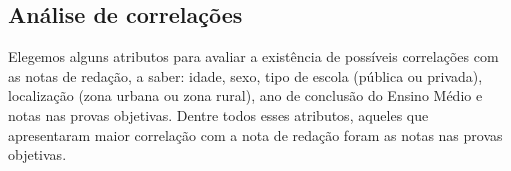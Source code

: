 \documentclass[12pt]{article}
\newcommand{\reffig}[1]{Fig.~\ref{fig:#1}}
\begin{document}

\subsection{Análise de correlações}
Elegemos alguns atributos para avaliar a existência de possíveis correlações com as notas de redação, a saber: idade, sexo, tipo de escola (pública ou privada), localização (zona urbana ou zona rural), ano de conclusão do Ensino Médio e notas nas provas objetivas.
Dentre todos esses atributos, aqueles que apresentaram maior correlação com a nota de redação foram as notas nas provas objetivas.

\end{document}
